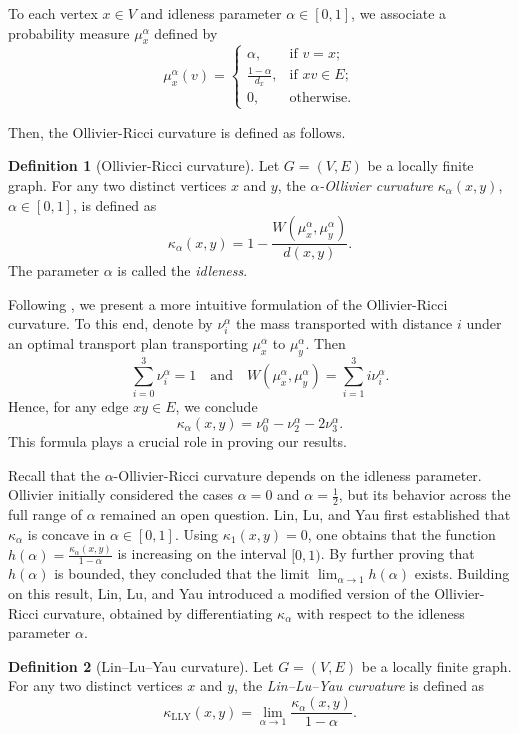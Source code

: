 \documentclass[10pt,a4paper]{article}
\theoremstyle{definition}
\newtheorem{defi}{Definition}[section]
\theoremstyle{definition}
\theoremstyle{nonumber}
\begin{document}
To each vertex $x \in V$ and idleness parameter $\alpha \in [0, 1]$, we associate a probability measure $\mu_x^\alpha$ defined by
$$
\mu_x^\alpha(v) =
\begin{cases} 
\alpha, & \text{if } v = x; \\ 
\frac{1-\alpha}{d_x}, & \text{if } xv \in E; \\ 
0, & \text{otherwise}.
\end{cases}
$$

Then, the Ollivier-Ricci curvature is defined as follows.

\begin{defi}[Ollivier-Ricci curvature]
Let $G = (V, E)$ be a locally finite graph. For any two distinct vertices $x$ and $y$, the \textit{$\alpha$-Ollivier curvature} $\kappa_\alpha(x, y)$, $\alpha \in [0, 1]$, is defined as
$$
\kappa_\alpha(x, y) = 1 - \frac{W(\mu_x^\alpha, \mu_y^\alpha)}{d(x, y)}.
$$
The parameter $\alpha$ is called the \textit{idleness}.
\end{defi}

Following \cite{Eidi}, we present a more intuitive formulation of the Ollivier-Ricci curvature. To this end, denote by $\nu_i^\alpha$ the mass transported with distance $i$ under an optimal transport plan transporting $\mu_x^\alpha$ to $\mu_y^\alpha$. Then
$$
\sum_{i=0}^{3} \nu_i^\alpha = 1 \quad \text{and} \quad W(\mu_x^\alpha, \mu_y^\alpha) = \sum_{i=1}^{3} i \nu_i^\alpha.
$$
Hence, for any edge $xy\in E$, we conclude
$$\kappa_\alpha(x, y) = \nu_0^\alpha - \nu_2^\alpha - 2 \nu_3^\alpha.$$
This formula plays a crucial role in proving our results.

Recall that the $\alpha$-Ollivier-Ricci curvature depends on the idleness parameter. Ollivier initially considered the cases $\alpha = 0$ and $\alpha = \frac{1}{2}$, but its behavior across the full range of $\alpha$ remained an open question. Lin, Lu, and Yau \cite{LLY} first established that $\kappa_\alpha$ is concave in $\alpha \in [0, 1]$. Using $\kappa_1(x, y) = 0$, one obtains that the function $h(\alpha) = \frac{\kappa_\alpha(x, y)}{1-\alpha}$ is increasing on the interval $[0, 1)$. By further proving that $h(\alpha)$ is bounded, they concluded that the limit $\lim_{\alpha \to 1} h(\alpha)$ exists. Building on this result, Lin, Lu, and Yau introduced a modified version of the Ollivier-Ricci curvature, obtained by differentiating $\kappa_\alpha$ with respect to the idleness parameter $\alpha$.


\begin{defi}[Lin--Lu--Yau curvature]
Let $G = (V, E)$ be a locally finite graph. For any two distinct vertices $x$ and $y$, the \textit{Lin--Lu--Yau curvature} is defined as
$$
\kappa_{\mathrm{LLY}}(x, y) = \lim_{\alpha \to 1} \frac{\kappa_\alpha(x, y)}{1-\alpha}.
$$
\end{defi}
\end{document}
